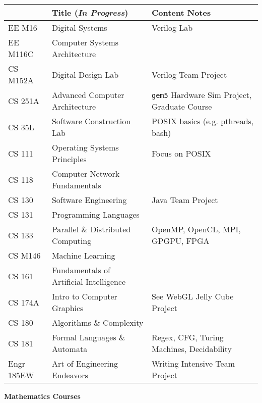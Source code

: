 \documentclass[11pt]{article}
\begin{document}
\begin{tabular}{l l l}
\hline
 & Title (\textit{In Progress}) & Content Notes \\
\hline
EE M16 & Digital Systems & Verilog Lab \\
EE M116C & Computer Systems Architecture & \\
CS M152A & Digital Design Lab & Verilog Team Project \\
CS 251A & Advanced Computer Architecture & \texttt{gem5} Hardware Sim Project, Graduate Course \\
\hline
CS 35L & Software Construction Lab & POSIX basics (e.g. pthreads, bash) \\
CS 111 & Operating Systems Principles & Focus on POSIX \\
CS 118 & Computer Network Fundamentals & \\
CS 130 & Software Engineering & Java Team Project \\
CS 131 & Programming Languages & \\
CS 133 & Parallel \& Distributed Computing & OpenMP, OpenCL, MPI, GPGPU, FPGA \\
CS M146 & Machine Learning & \\
CS 161 & Fundamentals of Artificial Intelligence & \\
CS 174A & Intro to Computer Graphics & See WebGL Jelly Cube Project \\
CS 180 & Algorithms \& Complexity & \\
CS 181 & Formal Languages \& Automata & Regex, CFG, Turing Machines, Decidability \\
\hline
Engr 185EW & Art of Engineering Endeavors & Writing Intensive Team Project \\
\hline
\end{tabular}

\newpage
\textbf{Mathematics Courses}
\end{document}
